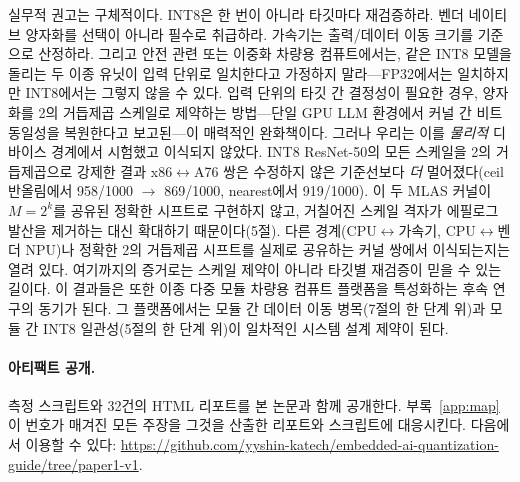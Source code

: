 \documentclass[11pt]{article}
\begin{document}
실무적 권고는 구체적이다. INT8은 한 번이 아니라 타깃마다 재검증하라. 벤더 네이티브 양자화를 선택이 아니라 필수로 취급하라. 가속기는 출력/데이터 이동 크기를 기준으로 산정하라. 그리고 안전 관련 또는 이중화 차량용 컴퓨트에서는, 같은 INT8 모델을 돌리는 두 이종 유닛이 입력 단위로 일치한다고 가정하지 말라---FP32에서는 일치하지만 INT8에서는 그렇지 않을 수 있다. 입력 단위의 타깃 간 결정성이 필요한 경우, 양자화를 2의 거듭제곱 스케일로 제약하는 방법---단일 GPU LLM 환경에서 커널 간 비트 동일성을 복원한다고 보고된\citep{chen2026deterministic}---이 매력적인 완화책이다. 그러나 우리는 이를 \emph{물리적} 디바이스 경계에서 시험했고 이식되지 않았다. INT8 ResNet-50의 모든 스케일을 2의 거듭제곱으로 강제한 결과 x86$\leftrightarrow$A76 쌍은 수정하지 않은 기준선보다 \emph{더} 멀어졌다(ceil 반올림에서 958/1000 $\to$ 869/1000, nearest에서 919/1000). 이 두 MLAS 커널이 $M = 2^k$를 공유된 정확한 시프트로 구현하지 않고, 거칠어진 스케일 격자가 에필로그 발산을 제거하는 대신 확대하기 때문이다(5절). 다른 경계(CPU$\leftrightarrow$가속기, CPU$\leftrightarrow$벤더 NPU)나 정확한 2의 거듭제곱 시프트를 실제로 공유하는 커널 쌍에서 이식되는지는 열려 있다. 여기까지의 증거로는 스케일 제약이 아니라 타깃별 재검증이 믿을 수 있는 길이다. 이 결과들은 또한 이종 다중 모듈 차량용 컴퓨트 플랫폼을 특성화하는 후속 연구의 동기가 된다. 그 플랫폼에서는 모듈 간 데이터 이동 병목(7절의 한 단계 위)과 모듈 간 INT8 일관성(5절의 한 단계 위)이 일차적인 시스템 설계 제약이 된다.

\paragraph{아티팩트 공개.} 측정 스크립트와 32건의 HTML 리포트를 본 논문과 함께 공개한다. 부록~\ref{app:map}이 번호가 매겨진 모든 주장을 그것을 산출한 리포트와 스크립트에 대응시킨다. 다음에서 이용할 수 있다: \url{https://github.com/yyshin-katech/embedded-ai-quantization-guide/tree/paper1-v1}.

\end{document}
